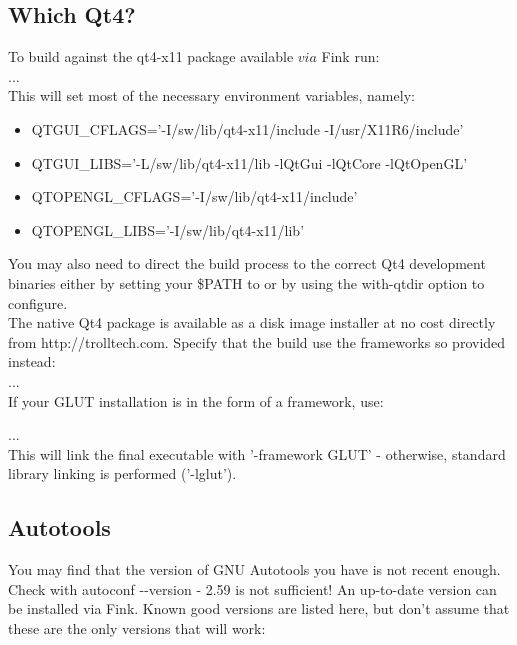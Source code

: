 \subsection{Which Qt4?}

To build against the qt4-x11 package available $via$ Fink run:\\

 ...\\

This will set most of the necessary environment variables, namely:\\
{\sffamily
\begin{itemize}
	\item QTGUI\_CFLAGS='-I/sw/lib/qt4-x11/include -I/usr/X11R6/include'
	\item QTGUI\_LIBS='-L/sw/lib/qt4-x11/lib -lQtGui -lQtCore -lQtOpenGL'
	\item QTOPENGL\_CFLAGS='-I/sw/lib/qt4-x11/include'
	\item QTOPENGL\_LIBS='-I/sw/lib/qt4-x11/lib'
\end{itemize}
}

You may also need to direct the build process to the correct Qt4 development binaries either by setting your \$PATH to  or by using the {\sffamily {-}{-}with-qtdir} option to {\sffamily configure}.\\

The native Qt4 package is available as a disk image installer at no cost directly from http://trolltech.com. Specify that the build use the frameworks so provided instead:\\

 ...\\

If your GLUT installation is in the form of a framework, use:

 ...\\

This will link the final executable with '-framework GLUT' - otherwise, standard library linking is performed ('-lglut').

\subsection{Autotools}
You may find that the version of GNU Autotools you have is not recent enough. Check with {\sffamily autoconf {-}{-}version} - 2.59 is not sufficient! An up-to-date version can be installed via Fink. Known good versions are listed here, but don't assume that these are the only versions that will work:\\

